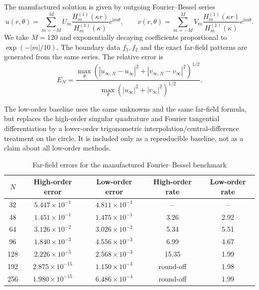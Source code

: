 \documentclass[11pt]{article}
\numberwithin{equation}{section}
\newcommand{\ii}{\mathrm{i}}
\begin{document}
The manufactured solution is given by outgoing Fourier--Bessel series
\begin{equation}
u(r,\theta)=\sum_{m=-M}^{M}U_m
\frac{H_m^{(1)}(\kappa r)}{H_m^{(1)}(\kappa)}e^{\ii m\theta},
\qquad
v(r,\theta)=\sum_{m=-M}^{M}V_m
\frac{H_m^{(1)}(\kappa r)}{H_m^{(1)}(\kappa)}e^{\ii m\theta}.
\end{equation}
We take $M=120$ and exponentially decaying coefficients proportional to $\exp(-|m|/10)$. The boundary data $f_1,f_2$ and the exact far-field patterns are generated from the same series. The relative error is
\begin{equation}
E_N=
\frac{\max_\theta\left(|u_{\infty,N}-u_\infty|^2+|v_{\infty,N}-v_\infty|^2\right)^{1/2}}
{\max_\theta\left(|u_\infty|^2+|v_\infty|^2\right)^{1/2}} .
\end{equation}

The low-order baseline uses the same unknowns and the same far-field formula, but replaces the high-order singular quadrature and Fourier tangential differentiation by a lower-order trigonometric interpolation/central-difference treatment on the circle. It is included only as a reproducible baseline, not as a claim about all low-order methods.

\begin{table}[htbp]
\centering
\caption{Far-field errors for the manufactured Fourier--Bessel benchmark}
\begin{tabular}{ccccc}
\toprule
$N$ & High-order error & Low-order error & High-order rate & Low-order rate\\
\midrule
32  &$5.447\times10^{-1}$&$4.811\times10^{-1}$&--&--\\
48  &$1.451\times10^{-1}$&$1.475\times10^{-1}$&3.26&2.92\\
64  &$3.126\times10^{-2}$&$3.026\times10^{-2}$&5.34&5.51\\
96  &$1.840\times10^{-3}$&$4.556\times10^{-3}$&6.99&4.67\\
128 &$2.226\times10^{-5}$&$2.568\times10^{-3}$&15.35&1.99\\
192 &$2.875\times10^{-15}$&$1.150\times10^{-3}$&round-off&1.98\\
256 &$1.980\times10^{-15}$&$6.486\times10^{-4}$&round-off&1.99\\
\bottomrule
\end{tabular}
\end{table}
\end{document}
